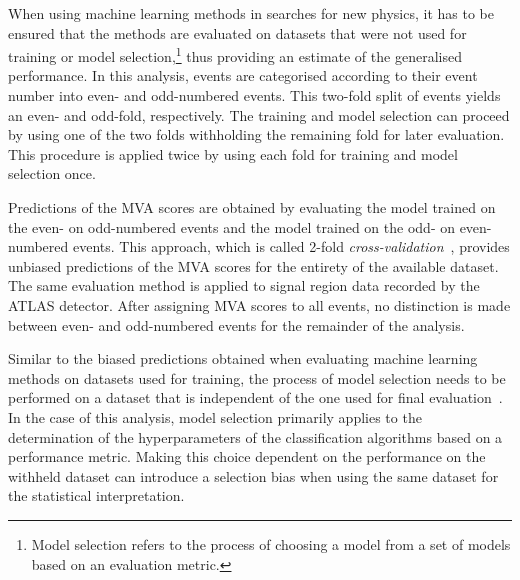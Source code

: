When using machine learning methods in searches for new physics, it
has to be ensured that the methods are evaluated on datasets that were
not used for training or model selection,\footnote{Model selection
  refers to the process of choosing a model from a set of models based
  on an evaluation metric.} thus providing an estimate of the
generalised performance. In this analysis, events are categorised
according to their event number into even- and odd-numbered
events. This two-fold split of events yields an even- and odd-fold,
respectively. The training and model selection can proceed by using
one of the two folds withholding the remaining fold for later
evaluation. This procedure is applied twice by using each fold for
training and model selection once.

Predictions of the MVA scores are obtained by evaluating the model
trained on the even- on odd-numbered events and the model trained on
the odd- on even-numbered events. This approach, which is called
2-fold \emph{cross-validation}~\cite{hastie09,bishop06}, provides
unbiased predictions of the MVA scores for the entirety of the
available dataset. The same evaluation method is applied to signal
region data recorded by the ATLAS detector. After assigning MVA scores
to all events, no distinction is made between even- and odd-numbered
events for the remainder of the analysis.


Similar to the biased predictions obtained when evaluating machine
learning methods on datasets used for training, the process of model
selection needs to be performed on a dataset that is independent of
the one used for final evaluation~\cite{cawley10}. In the case of this
analysis, model selection primarily applies to the determination of
the hyperparameters of the classification algorithms based on a
performance metric. Making this choice dependent on the performance on
the withheld dataset can introduce a selection bias when using the
same dataset for the statistical interpretation.

